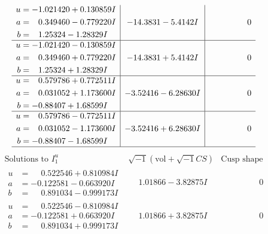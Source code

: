 \documentclass[1p]{elsarticle_modified}
\theoremstyle{definition}
\newcommand{\I}{\sqrt{-1}}
\begin{document}
$$\begin{array}{c|c|c}
\begin{aligned}
u &= -1.021420 + 0.130859 I \\
a &= \phantom{-}0.349460 - 0.779220 I \\
b &= \phantom{-}1.25324 - 1.28329 I\end{aligned}
 & -14.3831 - 5.4142 I & \phantom{-0.000000 } 0 \\ \hline\begin{aligned}
u &= -1.021420 - 0.130859 I \\
a &= \phantom{-}0.349460 + 0.779220 I \\
b &= \phantom{-}1.25324 + 1.28329 I\end{aligned}
 & -14.3831 + 5.4142 I & \phantom{-0.000000 } 0 \\ \hline\begin{aligned}
u &= \phantom{-}0.579786 + 0.772511 I \\
a &= \phantom{-}0.031052 + 1.173600 I \\
b &= -0.88407 + 1.68599 I\end{aligned}
 & -3.52416 - 6.28630 I & \phantom{-0.000000 } 0 \\ \hline\begin{aligned}
u &= \phantom{-}0.579786 - 0.772511 I \\
a &= \phantom{-}0.031052 - 1.173600 I \\
b &= -0.88407 - 1.68599 I\end{aligned}
 & -3.52416 + 6.28630 I & \phantom{-0.000000 } 0\\
 \hline 
 \end{array}$$\newpage$$\begin{array}{c|c|c}  
\text{Solutions to }I^u_{1}& \I (\text{vol} + \sqrt{-1}CS) & \text{Cusp shape}\\
 \hline 
\begin{aligned}
u &= \phantom{-}0.522546 + 0.810984 I \\
a &= -0.122581 - 0.663920 I \\
b &= \phantom{-}0.891034 - 0.999173 I\end{aligned}
 & \phantom{-}1.01866 - 3.82875 I & \phantom{-0.000000 } 0 \\ \hline\begin{aligned}
u &= \phantom{-}0.522546 - 0.810984 I \\
a &= -0.122581 + 0.663920 I \\
b &= \phantom{-}0.891034 + 0.999173 I\end{aligned}
 & \phantom{-}1.01866 + 3.82875 I & \phantom{-0.000000 } 0 \\ \hline\begin{aligned}

\end{aligned}
\end{array}$$
\end{document}

